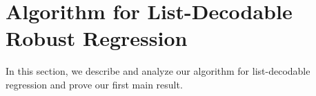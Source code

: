 





\section{Algorithm for List-Decodable Robust Regression}
In this section, we describe and analyze our algorithm for list-decodable regression and prove our first main result. 


